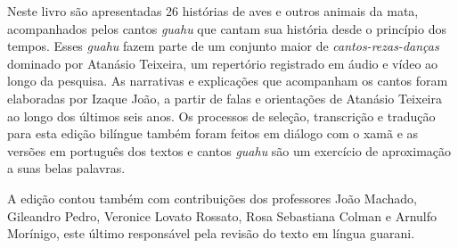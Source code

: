 Neste livro são apresentadas 26 histórias de aves e outros animais da
mata, acompanhados pelos cantos \textit{guahu} que cantam sua história
desde o princípio dos tempos. Esses \textit{guahu} fazem parte de um
conjunto maior de \textit{cantos-rezas-danças} dominado por Atanásio Teixeira, um
repertório registrado em áudio e vídeo ao longo da pesquisa. As
narrativas e explicações que acompanham os cantos foram elaboradas por
Izaque João, a partir de falas e orientações de Atanásio Teixeira ao
longo dos últimos seis anos. Os processos de seleção, transcrição e
tradução para esta edição bilíngue também foram feitos em diálogo com o
xamã e as versões em português dos textos e cantos \textit{guahu} são um
exercício de aproximação a suas belas palavras.

A edição contou também com contribuições dos professores João Machado,
Gileandro Pedro, Veronice Lovato Rossato, Rosa Sebastiana Colman e
Arnulfo Morínigo, este último responsável pela revisão do texto em
língua guarani.